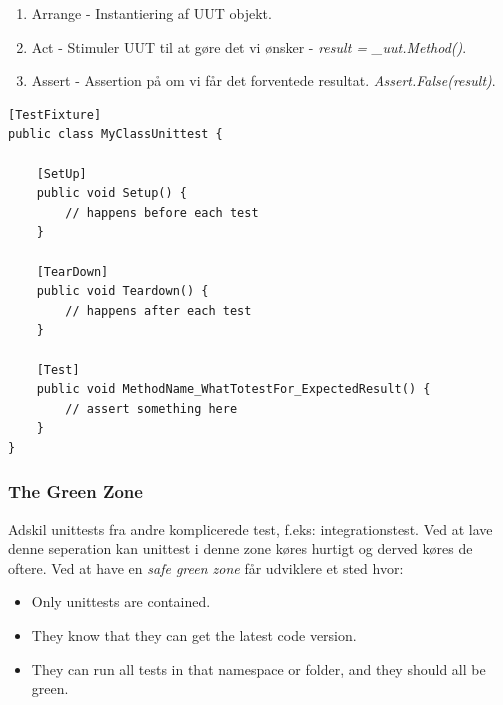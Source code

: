 \begin{enumerate}
	\item Arrange - Instantiering af UUT objekt.
	\item Act - Stimuler UUT til at gøre det vi ønsker - \textit{result = \_uut.Method()}.
	\item Assert - Assertion på om vi får det forventede resultat. \textit{Assert.False(result)}.
\end{enumerate}

\begin{lstlisting}[caption=NUnit eksempel på Setup og Teardown.,label=code:nunit]
[TestFixture]
public class MyClassUnittest {

	[SetUp]
	public void Setup() {
		// happens before each test
	}
	
	[TearDown]
	public void Teardown() {
		// happens after each test
	}
	
	[Test]
	public void MethodName_WhatTotestFor_ExpectedResult() {
		// assert something here
	}
}
\end{lstlisting}



\subsubsection{The Green Zone}
Adskil unittests fra andre komplicerede test, f.eks: integrationstest. Ved at lave denne seperation kan unittest i denne zone køres hurtigt og derved køres de oftere. Ved at have en \textit{safe \textcolor{green!80!black}{green} zone} får udviklere et sted hvor:

\begin{itemize}
	\item Only unittests are contained.
	\item They know that they can get the latest code version.
	\item They can run all tests in that namespace or folder, and they should all be green.
\end{itemize}

